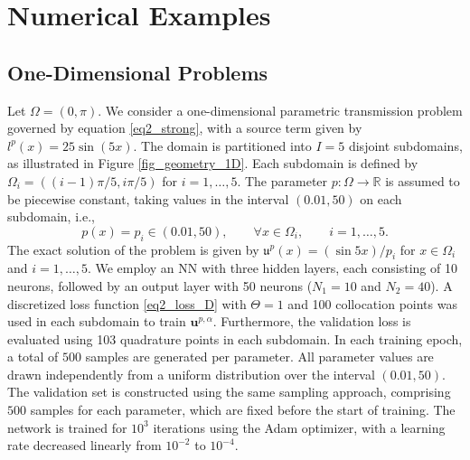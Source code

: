 \documentclass[oneside]{article}
\newcounter{reviewer}
\newcounter{point}[reviewer]
\begin{document}



\section{Numerical Examples}\label{Sec_Numerical Examples}
\subsection{One-Dimensional Problems}\label{One-Dimensional Problems}
Let $\Omega = (0, \pi)$. We consider a one-dimensional parametric transmission problem governed by equation \eqref{eq2_strong}, with a source term given by $l^p (x) = 25 \sin(5x)$. The domain is partitioned into $I=5$ disjoint subdomains, as illustrated in Figure \ref{fig_geometry_1D}. Each subdomain is defined by
$\Omega_i = ((i - 1)\pi/5, i\pi/5)$ for $ i = 1, \ldots, 5.$
The parameter $p:\Omega\to\mathbb{R}$ is assumed to be piecewise constant, taking values in the interval $(0.01, 50)$ on each subdomain, i.e.,
\begin{equation}\label{eq_sigma}
p(x)=p_i \in (0.01, 50), \qquad \forall x\in \Omega_i, \qquad i = 1, \ldots, 5.
\end{equation}
The exact solution of the problem is given by
$ \mathfrak{u}^p(x)= (\sin{5x})/{p_i}$ for $ x\in \Omega_i$ and $i = 1, \ldots, 5$. 
We employ an NN with 
three hidden layers, each consisting of 10 neurons, 
followed by an output layer with 50 neurons ($N_1 =10$ and  $N_2=40$). 
A discretized loss function \eqref{eq2_loss_D} with $\Theta = 1$ and 100 collocation points was used in each subdomain to train $\mathbf{u}^{p, \alpha}$. Furthermore, the validation loss is evaluated using 103 quadrature points in each subdomain. In each training epoch, a total of \( 500 \) samples are generated per parameter. All parameter values are drawn independently from a uniform distribution over the interval \( (0.01, 50) \). The validation set is constructed using the same sampling approach, comprising $500$ samples for each parameter, which are fixed before the start of training.  The network is trained for $10^3$ iterations using the Adam optimizer, with a learning rate decreased linearly from $10^{-2}$ to $10^{-4}$. 
\end{document}
